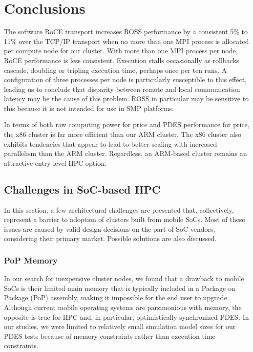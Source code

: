 \documentclass[11pt]{book}
\begin{document}
\chapter{Conclusions}\label{conclusions}

The software RoCE transport increases ROSS performance by a consistent 5\% to 11\% over
the TCP/IP transport when no more than one MPI process is allocated per compute node for
our cluster.  With more than one MPI process per node, RoCE performance is less
consistent.  Execution stalls occasionally as rollbacks cascade, doubling or tripling
execution time, perhaps once per ten runs.  A configuration of three processes per node is
particularly susceptible to this effect, leading us to conclude that disparity between
remote and local communication latency may be the cause of this problem.  ROSS in
particular may be sensitive to this because it is not intended for use in SMP platforms.

In terms of both raw computing power for price and PDES performance for price, the x86
cluster is far more efficient than our ARM cluster.  The x86 cluster also exhibits
tendencies that appear to lead to better scaling with increased parallelism than the ARM
cluster. Regardless, an ARM-based cluster remains an attractive entry-level HPC option.

\section{Challenges in SoC-based HPC}

In this section, a few architectural challenges are presented that, collectively,
represent a barrier to adoption of clusters built from mobile SoCs.  Most of these issues
are caused by valid design decisions on the part of SoC vendors, considering their primary
market.  Possible solutions are also discussed.

\subsection{PoP Memory}

In our search for inexpensive cluster nodes, we found that a drawback to mobile SoCs is
their limited main memory that is typically included in a Package on Package (PoP)
assembly, making it impossible for the end user to upgrade.  Although current mobile
operating systems are parsimonious with memory, the opposite is true for HPC and, in
particular, optimistically synchronized PDES.  In our studies, we were limited to
relatively small simulation model sizes for our PDES tests because of memory constraints
rather than execution time constraints.
\end{document}
